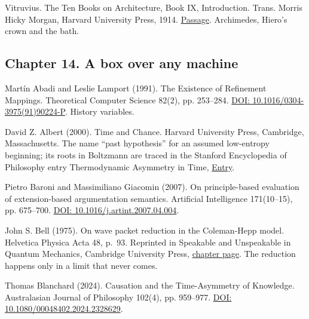 \documentclass[11pt,twoside]{article}
\theoremstyle{thielethm}
\theoremstyle{thieledef}
\theoremstyle{thieledef}
\theoremstyle{thieledef}
\theoremstyle{thielethm}
\theoremstyle{thieleobs}
\theoremstyle{thielethm}
\begin{document}
\noindent Vitruvius. The Ten Books on Architecture, Book IX, Introduction. Trans. Morris Hicky Morgan, Harvard University Press, 1914. \href{https://math.nyu.edu/Archimedes/Crown/Vitruvius.html}{Passage}. Archimedes, Hiero's crown and the bath.
\par\medskip

\subsection*{Chapter 14. A box over any machine}

\noindent Mart\'in Abadi and Leslie Lamport (1991). The Existence of Refinement Mappings. Theoretical Computer Science 82(2), pp. 253--284. \href{https://doi.org/10.1016/0304-3975(91)90224-P}{DOI: 10.1016/0304-3975(91)90224-P}. History variables.
\par\medskip

\noindent David Z. Albert (2000). Time and Chance. Harvard University Press, Cambridge, Massachusetts. The name ``past hypothesis'' for an assumed low-entropy beginning; its roots in Boltzmann are traced in the Stanford Encyclopedia of Philosophy entry Thermodynamic Asymmetry in Time, \href{https://plato.stanford.edu/entries/time-thermo/}{Entry}.
\par\medskip

\noindent Pietro Baroni and Massimiliano Giacomin (2007). On principle-based evaluation of extension-based argumentation semantics. Artificial Intelligence 171(10--15), pp. 675--700. \href{https://doi.org/10.1016/j.artint.2007.04.004}{DOI: 10.1016/j.artint.2007.04.004}.
\par\medskip

\noindent John S. Bell (1975). On wave packet reduction in the Coleman-Hepp model. Helvetica Physica Acta 48, p.~93. Reprinted in Speakable and Unspeakable in Quantum Mechanics, Cambridge University Press, \href{https://www.cambridge.org/core/books/speakable-and-unspeakable-in-quantum-mechanics/on-wave-packet-reduction-in-the-colemanhepp-model/95A04BE1845F5490A462D929930CA7E8}{chapter page}. The reduction happens only in a limit that never comes.
\par\medskip

\noindent Thomas Blanchard (2024). Causation and the Time-Asymmetry of Knowledge. Australasian Journal of Philosophy 102(4), pp. 959--977. \href{https://doi.org/10.1080/00048402.2024.2328629}{DOI: 10.1080/00048402.2024.2328629}.
\par\medskip
\end{document}
